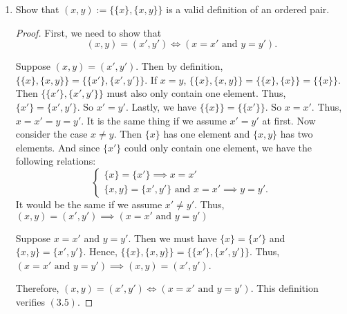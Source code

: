 \documentclass[12pt, letter]{article}
\begin{document}
\begin{enumerate}
    \item Show that $(x,y):=\{\{x\},\{x,y\}\}$ is a valid definition of an ordered pair.
    \begin{proof}
        First, we need to show that 
        \begin{equation*}
            (x,y)=(x',y')\iff (x=x'\text{ and }y=y').
        \end{equation*} 

        Suppose $(x,y)=(x',y')$. Then by definition, $\{\{x\},\{x,y\}\}=\{\{x'\},\{x',y'\}\}$. If $x=y$, $\{\{x\},\{x,y\}\}=\{\{x\},\{x\}\}=\{\{x\}\}$. 
        Then $\{\{x'\},\{x',y'\}\}$ must also only contain one element. Thus, $\{x'\}=\{x',y'\}$. So $x'=y'$. Lastly, we have $\{\{x\}\}=\{\{x'\}\}$. So $x=x'$. 
        Thus, $x=x'=y=y'$. It is the same thing if we assume $x'=y'$ at first. Now consider the case $x\ne y$. Then 
        $\{x\}$ has one element and $\{x,y\}$ has two elements. And since $\{x'\}$ could only contain one element, we have the following relations:
        \begin{equation*}
            \begin{cases}
                \{x\}=\{x'\}\implies x=x'\\
                \{x,y\}=\{x',y'\}\text{ and }x=x' \implies y=y'.
            \end{cases}
        \end{equation*}
        It would be the same if we assume $x'\ne y'$. Thus, $(x,y)=(x',y')\implies (x=x'\text{ and }y=y')$

        Suppose $x=x'$ and $y=y'$. Then we must have $\{x\}=\{x'\}$ and $\{x,y\}=\{x',y'\}$. Hence, $\{\{x\},\{x,y\}\}=\{\{x'\},\{x',y'\}\}$. 
        Thus, $(x=x'\text{ and }y=y')\implies (x,y)=(x',y')$.

        Therefore, $(x,y)=(x',y')\iff (x=x'\text{ and }y=y')$. This definition verifies $(3.5)$. 
    

\end{proof}
\end{enumerate}
\end{document}
